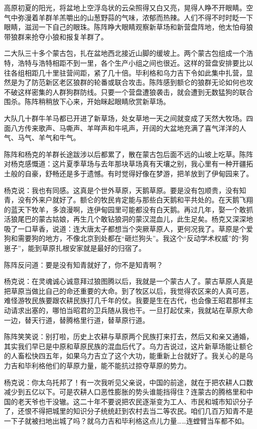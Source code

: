 \par 高原初夏的阳光，将盆地上空浮岛状的云朵照得又白又亮，晃得人睁不开眼睛。空气中弥漫着羊群羊羔嚼出的山葱野蒜的气味，浓郁而热辣。人们不得不时时眨一下眼睛，滋润一下自己的眼珠。陈阵睁大眼睛观察新草场和新营盘阵地，他太怕母狼带狼群来抢夺小狼和报复羊群了。
\par 二大队三十多个蒙古包，扎在盆地西北接近山脚的缓坡上。两个蒙古包组成一个浩特，浩特与浩特相距不到一里，各个生产小组之间也很近。这样的营盘安排要比以往各组相距几十里驻营间距，紧了几十倍。毕利格和乌力吉下令如此集中扎营，显然是为了防范新区老区狼群的轮番或联合攻击。陈阵感到额仑的狼群无论如何也攻不破这样密集的人群狗群防线。只要一个营盘遭狼袭击，就会遭到无数猛狗的联合围杀。陈阵稍稍放下心来，开始眯起眼睛欣赏新草场。
\par 大队几十群牛羊马都已开进了新草场，处女草地一天之间就变成了天然大牧场。四面八方传来歌声、马嘶声、羊咩声和牛吼声，开阔的大盆地充满了喜气洋洋的人气、马气、羊气和牛气。
\par 陈阵和杨克的羊群长途跋涉以后都累了，散在蒙古包后面不远的山坡上吃草。陈阵对杨克感慨道：这片夏季草场与去年那块草场真有天壤之别，我心里有一种开疆拓土般的自豪，舒畅还是多于遗憾。有时觉得好像在梦游，把羊放到了伊甸园来了。
\par 杨克说：我也有同感。这真是个世外草原，天鹅草原。要是没有包顺贵，没有知青，没有外来户就好了。额仑的牧民肯定能与那些白天鹅和平共处的。在天鹅飞翔的蓝天下牧羊，多浪漫啊，连伊甸园里可能都没有白天鹅。再过几年，娶一个敢抓活狼尾巴的蒙古姑娘，再生几个敢钻狼洞的蒙汉混血儿，此生足矣。杨克又深深地吸了一口草香，说道：连大唐太子都想当个突厥草原人，更何况我了。草原是个爱狗和需要狗的地方，不像北京到处都在“砸烂狗头”。我这个“反动学术权威”的“狗崽子”，能到草原扎根安家就是最好的归宿了。
\par 陈阵反问道：要是没有知青就好了，你不是知青啊？
\par 杨克说：在灵魂诚心诚意拜过狼图腾以后，我就是一个蒙古人了。蒙古草原人真是把草原当做比自己的命还重要的大命。到了牧区以后，我觉得农区来的人真可恶，难怪游牧民族要跟农耕民族打几千年的仗。我要是生在古代，也会像王昭君那样主动请求出塞的，哪怕当昭君的卫兵随从我也干。一旦打起仗来，我就站在草原大命一边，替天行道，替腾格里行道，替草原行道。
\par 陈阵笑笑说：别打啦，历史上农耕与草原两个民族打来打去，然后又和亲又通婚，其实我们早已是中原和草原民族的混血后代了。乌力吉说过，这片新草场能让额仑的人畜松快四五年，如果乌力吉立了这个大功，能重新上台就好了。我关心的是乌力吉和毕利格他们的草原力量，能不能抗过掠夺草原的势力。
\par 杨克说：你太乌托邦了！有一次我听见父亲说，中国的前途，就在于把农耕人口数减少到五亿以下。可是农耕人口恶性膨胀的势头谁能挡得住？连蒙古的腾格里和中国的老天爷也干没辙。这二十年不要说把农民逐渐变为工人、市民和城市知识分子了，还恨不得把城里的知识分子统统赶到农村去当二等农民。咱们几百万知青不是一下子就被扫地出城了吗？就乌力吉和毕利格这点儿力量……连螳臂当车都不如。
